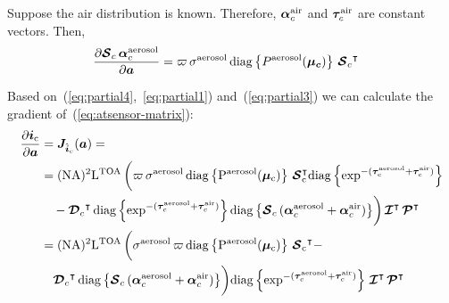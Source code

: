 \documentclass[10pt,twocolumn,letterpaper]{article}
\newcommand{\OpSphere}{\bm{\mathcal{S}}}
\newcommand{\OpDistance}{\bm{\mathcal{D}}}
\newcommand{\OpInt}{\bm{\mathcal{I}}}
\newcommand{\OpCamera}{\bm{\mathcal{P}}}
\newcommand{\OpDiag}[1]{\mathrm{diag}\left\{#1\right\}}
\newcommand{\PartDeriv}[2]{\frac{\partial{#1}}{\partial{#2}}}
\newcommand{\vect}[1]{\bm{#1}}
\newcommand{\mat}[1]{\bm{#1}}
\newcommand{\transpose}[1]{{#1}^\intercal}
\begin{document}
Suppose the air distribution is known. Therefore, $\vect{\alpha}^{\rm
  air}_c$ and $\vect{\tau}^{\rm air}_c$ are constant vectors. Then,
\begin{align}
  \label{eq:partial3}
  \PartDeriv{\OpSphere_c \, \vect{\alpha}^{\rm aerosol}_c}{\vect{a}}
  &= \varpi \, \sigma^{\rm aerosol} \, \OpDiag{P^{\rm
      aerosol}(\vect{\mu_c})} \, \transpose{\OpSphere_c}
\end{align}

Based on~(\ref{eq:partial4},~\ref{eq:partial1})
and~(\ref{eq:partial3}) we can calculate the gradient
of~(\ref{eq:atsensor-matrix}):
\begin{align}
  \PartDeriv{\vect{i}_{\rm c}}{\vect{a}} &=
  \mat{J}_{\hat{\vect{i}}_c}(\vect{a})= \nonumber \\
  &= (\rm{NA})^2 \mathrm{L}^{\rm TOA} \, \biggl( \varpi \, \sigma^{\rm
    aerosol} \, \OpDiag{P^{\rm aerosol}(\vect{\mu}_c)} \,
  \transpose{\OpSphere}_c \OpDiag{\exp^{-(\vect{\tau}^{\rm aerosol}_c
      + \vect{\tau}^{\rm
        air}_c)}} \nonumber \\
  &\quad - \transpose{\OpDistance_c} \, \OpDiag{\exp^{-(\vect{\tau}^{\rm
        aerosol}_c + \vect{\tau}^{\rm air}_c)}}\OpDiag{\OpSphere_c \,
    (\vect{\alpha}^{\rm aerosol}_c + \vect{\alpha}^{\rm air}_c)}
  \biggr)
  \, \transpose{\OpInt} \, \transpose{\OpCamera} \nonumber \\
  &= (\rm{NA})^2\mathrm{L}^{\rm TOA} \, \biggl( \sigma^{\rm aerosol}
  \, \varpi \,
  \OpDiag{P^{\rm aerosol}(\vect{\mu}_c)} \, \transpose{\OpSphere_c} - \nonumber \\
  &\quad \transpose{\OpDistance_c} \, \OpDiag{\OpSphere_c \,
    (\vect{\alpha}^{\rm aerosol}_c + \vect{\alpha}^{\rm air}_c )}
  \biggr) \OpDiag{\exp^{-(\vect{\tau}^{\rm aerosol}_c +
      \vect{\tau}^{\rm air}_c)}} \, \transpose{\OpInt} \,
  \transpose{\OpCamera}
\end{align}



{\small


}
\end{document}
